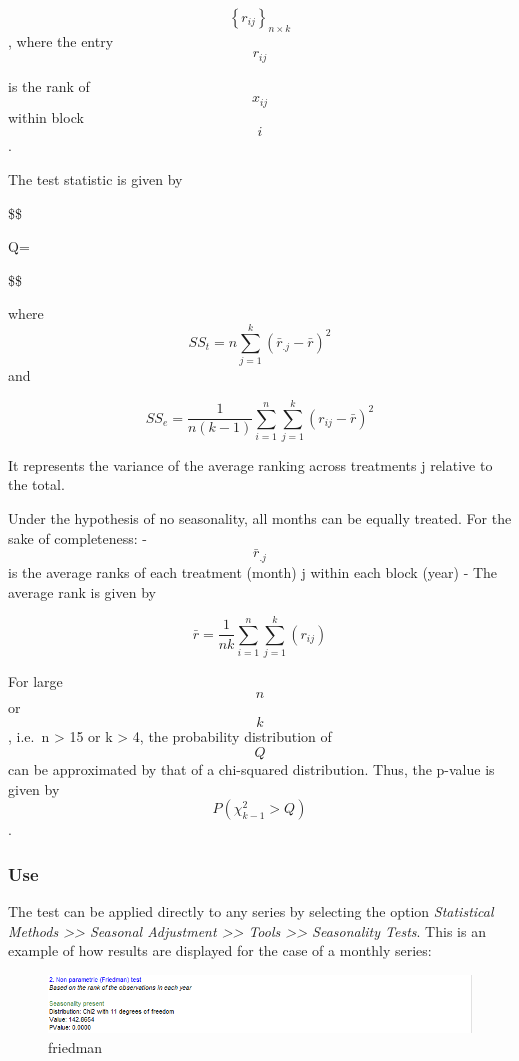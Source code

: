 \documentclass[
  letterpaper,
  DIV=11,
  numbers=noendperiod]{scrreprt}
\begin{document}
\[ \left\{r_{ij}\right\}_{n \times k} \], where the entry \[ r_{ij} \]

is the rank of \[ x_{ij} \] within block \[ i \] .

The test statistic is given by

\$\$

Q=

\$\$

where \[ SS_t=n \sum_{j=1}^{k}(\bar{r}_{.j}-\bar{r})^2 \] and

\[ SS_e=\frac{1}{n(k-1)} \sum_{i=1}^{n}\sum_{j=1}^{k}(r_{ij}-\bar{r})^2 \]

It represents the variance of the average ranking across treatments j
relative to the total.

Under the hypothesis of no seasonality, all months can be equally
treated. For the sake of completeness: - \[ \bar{r}_{.j} \] is the
average ranks of each treatment (month) j within each block (year) - The
average rank is given by

\[ \bar{r}= \frac{1}{nk}\sum_{i=1}^{n}\sum_{j=1}^{k}(r_{ij})\]

For large \[ n \] or \[ k \] , i.e.~n \textgreater{} 15 or k
\textgreater{} 4, the probability distribution of \[ Q \] can be
approximated by that of a chi-squared distribution. Thus, the p-value is
given by \[ P( \chi^2_{k-1}>Q) \] .

\hypertarget{use-1}{%
\subsubsection{Use}\label{use-1}}

The test can be applied directly to any series by selecting the option
\emph{Statistical Methods \textgreater\textgreater{} Seasonal Adjustment
\textgreater\textgreater{} Tools \textgreater\textgreater{} Seasonality
Tests}. This is an example of how results are displayed for the case of
a monthly series:

\begin{figure}

{\centering \includegraphics{./All_images/friedman.png}

}

\caption{friedman}

\end{figure}
\end{document}
